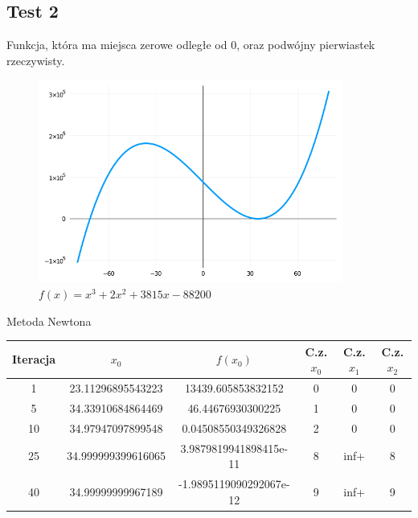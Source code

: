 \documentclass[a4paper]{article}
\begin{document}
\newpage
\subsection{Test 2}
    Funkcja, która ma miejsca zerowe odległe od 0, oraz podwójny pierwiastek rzeczywisty.
    \begin{figure}[h]
        \centering
        \includegraphics[width=10cm]{2}
        \caption{$f(x) = x^3 + 2x^2 + 3815x - 88200$}
    \end{figure}

    \begin{center}
        Metoda Newtona
    \end{center}
    \begin{center}
        \begin{tabular}{|c|c|c|c|c|c|} 
            \hline
            Iteracja & $x_0$ & $f(x_0)$ & C.z. $x_0$ & C.z. $x_1$ & C.z. $x_2$ \\
            \hline
            1 & 23.11296895543223 & 13439.605853832152 & 0 & 0 & 0 \\
            \hline
            5 & 34.33910684864469 & 46.44676930300225 & 1 & 0 & 0 \\
            \hline
            10 & 34.97947097899548 & 0.04508550349326828 & 2 & 0 & 0 \\
            \hline
            25 & 34.999999399616065 & 3.9879819941898415e-11 & 8 & inf+ & 8 \\
            \hline
            40 & 34.99999999967189 & -1.9895119090292067e-12 & 9 & inf+ & 9 \\
            \hline
        \end{tabular}
    \end{center}
        
    \vspace{5mm}
\end{document}
